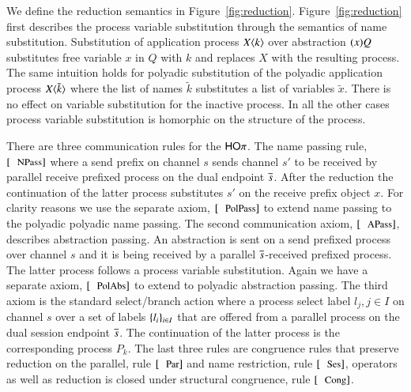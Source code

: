 We define the reduction semantics in Figure~\ref{fig:reduction}.
Figure~\ref{fig:reduction} first describes the process variable
substitution through the semantics
of name substitution. Substitution of application process $X\langle k \rangle$
over abstraction $(x)Q$ substitutes free variable
$x$ in $Q$ with $k$ and replaces $X$ with the resulting process.
The same intuition holds for polyadic substitution of the polyadic
application process $X\langle \tilde{k} \rangle$ where the list of names
$\tilde{k}$ substitutes a list of variables $\tilde{x}$.
There is no effect on variable substitution for the inactive process.
In all the other cases process variable substitution is homorphic 
on the structure of the process.



There are three communication rules for the $\mathsf{HO}\pi$. The name passing
rule, $\orule{NPass}$ where a send prefix on channel $s$ sends
channel $s'$ to be received by parallel receive prefixed process
on the dual endpoint $\overline{s}$. After the reduction the continuation of the 
latter process substitutes $s'$ on the receive prefix object $x$.
For clarity reasons we use the separate axiom, $\orule{PolPass}$
to extend name passing to the polyadic polyadic name passing.
The second communication axiom, $\orule{APass}$, describes
abstraction passing. An abstraction is sent on a send prefixed process
over channel $s$ and it is being received by a parallel $\overline{s}$-received
prefixed process. The latter process follows a process variable
substitution.
Again we have a separate axiom, $\orule{PolAbs}$
to extend to polyadic abstraction passing.
The third axiom is the standard select/branch action where
a process select label $l_j, j \in I$ on channel $s$ over a set of
labels $\{l_i\}_{i \in I}$ that are offered from a parallel process
on the dual session endpoint $\overline{s}$. The continuation of the latter
process is the corresponding process $P_k$.
The last three rules are congruence rules that preserve reduction
on the parallel, rule $\orule{Par}$ and name restriction, rule $\orule{Ses}$,
operators as well as reduction is closed under structural congruence, rule $\orule{Cong}$.



